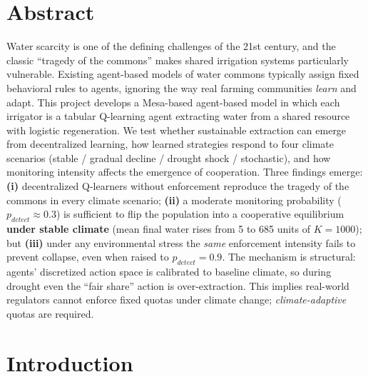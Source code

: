 \documentclass[12pt, a4paper]{article}
\begin{document}
\newpage
\tableofcontents
\newpage

\section*{Abstract}

Water scarcity is one of the defining challenges of the 21st century, and the
classic ``tragedy of the commons'' makes shared irrigation systems particularly
vulnerable. Existing agent-based models of water commons typically assign fixed
behavioral rules to agents, ignoring the way real farming communities \emph{learn}
and adapt. This project develops a Mesa-based agent-based model in which each
irrigator is a tabular Q-learning agent extracting water from a shared resource
with logistic regeneration. We test whether sustainable extraction can emerge
from decentralized learning, how learned strategies respond to four climate
scenarios (stable / gradual decline / drought shock / stochastic), and how
monitoring intensity affects the emergence of cooperation. Three findings
emerge: \textbf{(i)} decentralized Q-learners without enforcement reproduce the
tragedy of the commons in every climate scenario; \textbf{(ii)} a moderate
monitoring probability ($p_{detect} \approx 0.3$) is sufficient to flip the
population into a cooperative equilibrium \textbf{under stable climate} (mean
final water rises from 5 to 685 units of $K{=}1000$); but \textbf{(iii)} under
any environmental stress the \emph{same} enforcement intensity fails to prevent
collapse, even when raised to $p_{detect}=0.9$. The mechanism is structural:
agents' discretized action space is calibrated to baseline climate, so during
drought even the ``fair share'' action is over-extraction. This implies
real-world regulators cannot enforce fixed quotas under climate change;
\emph{climate-adaptive} quotas are required.

\newpage

\section{Introduction}
\end{document}
